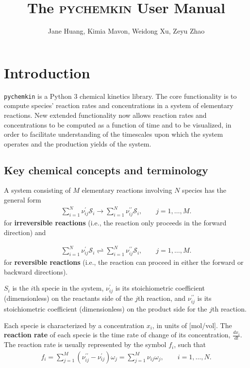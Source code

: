 \documentclass[12pt]{article}
\begin{document}
\title{The \textsc{pychemkin} User Manual}
\author{Jane Huang, Kimia Mavon, Weidong Xu, Zeyu Zhao}
\date{}
\maketitle
\section{Introduction}


{\tt pychemkin} is a Python 3 chemical kinetics library. The core functionality is to compute species' reaction rates and concentrations in a system of elementary reactions. New extended functionality now allows reaction rates and concentrations to be computed as a function of time and to be visualized, in order to facilitate understanding of the timescales upon which the system operates and the production yields of the system. 

\subsection{Key chemical concepts and terminology}

A system consisting of $M$ elementary reactions involving $N$ species has the general form
\begin{align}
  \sum_{i=1}^{N}{\nu_{ij}^{\prime}\mathcal{S}_{i}} \longrightarrow
  \sum_{i=1}^{N}{\nu_{ij}^{\prime\prime}\mathcal{S}_{i}}, \qquad j = 1, \ldots, M.
\end{align}
for \textbf{irreversible reactions} (i.e., the reaction only proceeds in the forward direction) and 

\begin{align}
  \sum_{i=1}^{N}{\nu_{ij}^{\prime}\mathcal{S}_{i}} \rightleftharpoons
  \sum_{i=1}^{N}{\nu_{ij}^{\prime\prime}\mathcal{S}_{i}}, \qquad j = 1, \ldots, M.
\end{align}
for \textbf{reversible reactions} (i.e., the reaction can proceed in either the forward or backward directions). 

$S_i$ is the $i$th specie in the system, $\nu_{ij}^{\prime}$ is its stoichiometric coefficient (dimensionless) on the reactants side of the $j$th reaction, and $\nu_{ij}^{\prime\prime}$ is its stoichiometric coefficient (dimensionless) on the product side for the $j$th reaction.

Each specie is characterized by a concentration $x_i$, in units of [mol/vol].
The \textbf{reaction rate} of each specie is the time rate of change of its concentration, $\frac{dx_i}{dt}$. The reaction rate is usually represented by the symbol $f_i$, such that
\begin{align}
  f_{i} = \sum_{j=1}^{M}{(\nu_{ij}^{\prime\prime}-\nu_{ij}^\prime)\omega_{j}}= \sum_{j=1}^{M}{\nu_{ij}\omega_{j}}, \qquad i = 1, \ldots, N.
\end{align}
\end{document}
